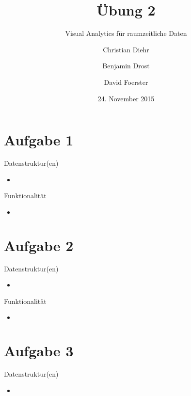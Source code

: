 \documentclass{beamer}
\title{Übung 2}
\subtitle{Visual Analytics für raumzeitliche Daten}
\author{Christian Diehr \and Benjamin Drost \and David Foerster}
\institute{Institut für Informatik\\Humboldt-Universität zu Berlin}
\date{24. November 2015}
\begin{document}
    \begin{frame}
        \titlepage
    \end{frame}
    \logo %

    \section{Aufgabe 1}
    \begin{frame}{Datenstruktur(en)}
        \begin{itemize}
	        \setlength\itemsep{1em}
        	\item 
        \end{itemize}
    \end{frame}
    
    \begin{frame}{Funktionalität}
    	\begin{itemize}
    		\setlength\itemsep{1em}
    		\item 
    	\end{itemize}
    \end{frame}

    \section{Aufgabe 2}
    \begin{frame}{Datenstruktur(en)}
    	\begin{itemize}
    		\setlength\itemsep{1em}
    		\item 
    	\end{itemize}
    \end{frame}
    
    \begin{frame}{Funktionalität}
    	\begin{itemize}
    		\setlength\itemsep{1em}
    		\item 
    	\end{itemize}
    \end{frame}

    \section{Aufgabe 3}
    \begin{frame}{Datenstruktur(en)}
    	\begin{itemize}
    		\setlength\itemsep{1em}
    		\item 
    	\end{itemize}
    \end{frame}
    
\end{document}
